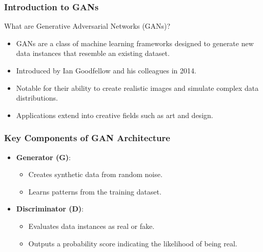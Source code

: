 \documentclass[aspectratio=169]{beamer}
\begin{document}
\begin{frame}[fragile]
    \frametitle{Introduction to GANs}
    \begin{block}{What are Generative Adversarial Networks (GANs)?}
        \begin{itemize}
            \item GANs are a class of machine learning frameworks designed to generate new data instances that resemble an existing dataset.
            \item Introduced by Ian Goodfellow and his colleagues in 2014.
            \item Notable for their ability to create realistic images and simulate complex data distributions.
            \item Applications extend into creative fields such as art and design.
        \end{itemize}
    \end{block}
\end{frame}

\begin{frame}[fragile]
    \frametitle{Key Components of GAN Architecture}
    \begin{itemize}
        \item \textbf{Generator (G)}:
        \begin{itemize}
            \item Creates synthetic data from random noise.
            \item Learns patterns from the training dataset.
        \end{itemize}
        
        \item \textbf{Discriminator (D)}:
        \begin{itemize}
            \item Evaluates data instances as real or fake.
            \item Outputs a probability score indicating the likelihood of being real.
        \end{itemize}
    \end{itemize}
\end{frame}
\end{document}
